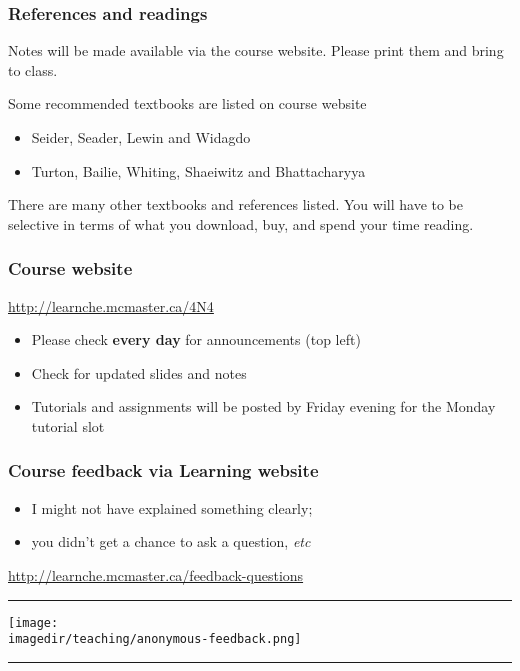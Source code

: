 \begin{frame}\frametitle{References and readings}
	
	Notes will be made available via the course website. Please print them and bring to class.
	
	\vspace{12pt}
	\vspace{12pt}
	Some recommended textbooks are listed on course website
	\begin{itemize}
		\item	Seider, Seader, Lewin and Widagdo
		\item	Turton, Bailie, Whiting, Shaeiwitz and Bhattacharyya
	\end{itemize}
		
	\vspace{12pt}
	There are many other textbooks and references listed. You will have to be selective in terms of what you download, buy, and spend your time reading.
\end{frame}

\begin{frame}\frametitle{Course website}	
	\begin{exampleblock}{}
		\centering 
		\href{http://learnche.mcmaster.ca/4N4}{http://learnche.mcmaster.ca/4N4}
	\end{exampleblock}
	\begin{itemize}
		\item	Please check \textbf{every day} for announcements {\tiny (top left)}
		\item	Check for updated slides and notes
		\item	Tutorials and assignments will be posted by Friday evening for the Monday tutorial slot
	\end{itemize}
\end{frame}

\begin{frame}\frametitle{Course feedback via Learning website}
	\begin{itemize}
		\item	I might not have explained something clearly;  
		\item	you didn't get a chance to ask a question, \emph{etc}		
	\end{itemize}
	\href{http://learnche.mcmaster.ca/feedback-questions}{http://learnche.mcmaster.ca/feedback-questions}
	\vspace{12pt}
	\hrule
	\begin{center}
		\texttt{[image: \\imagedir/teaching/anonymous-feedback.png]}
	\end{center}
	\hrule
\end{frame}

